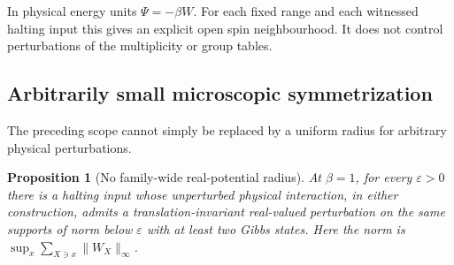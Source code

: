 \documentclass[11pt,reqno]{amsart}
\numberwithin{equation}{section}
\newtheorem{proposition}[theorem]{Proposition}
\theoremstyle{definition}
\theoremstyle{remark}
\newcommand{\norm}[1]{\lVert#1\rVert}
\begin{document}
In physical energy units $\Psi=-\beta W$. For each fixed range and each witnessed halting input this gives an explicit open spin neighbourhood. It does not control perturbations of the multiplicity or group tables.

\subsection{Arbitrarily small microscopic symmetrization}\label{sec:symmetry}
The preceding scope cannot simply be replaced by a uniform radius for arbitrary physical perturbations.

\begin{proposition}[No family-wide real-potential radius]\label{prop:symmetrize}
At $\beta=1$, for every $\varepsilon>0$ there is a halting input whose unperturbed physical interaction, in either construction, admits a translation-invariant real-valued perturbation on the same supports of norm below $\varepsilon$ with at least two Gibbs states. Here the norm is $\sup_x\sum_{X\ni x}\norm{W_X}_\infty$.
\end{proposition}
\end{document}
